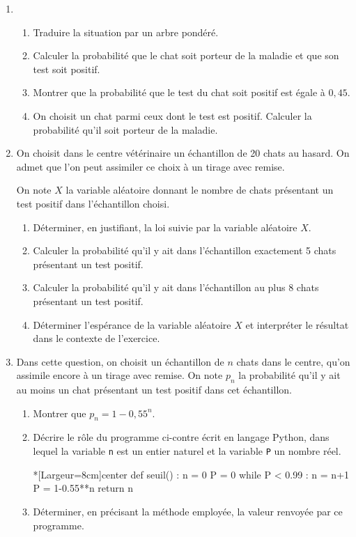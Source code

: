 \begin{enumerate}
	\item 
	\begin{enumerate}
		\item Traduire la situation par un arbre pondéré.
		\item Calculer la probabilité que le chat soit porteur de la maladie et que son test soit positif.
		\item Montrer que la probabilité que le test du chat soit positif est égale à $0,45$.
		\item On choisit un chat parmi ceux dont le test est positif. Calculer la probabilité qu’il soit porteur de la maladie.
	\end{enumerate}
	\item On choisit dans le centre vétérinaire un échantillon de 20 chats au hasard. On admet que l’on peut assimiler ce choix à un tirage avec remise.
	
	On note $X$ la variable aléatoire donnant le nombre de chats présentant un test positif dans
	l’échantillon choisi.
	\begin{enumerate}
		\item Déterminer, en justifiant, la loi suivie par la variable aléatoire $X$.
		\item Calculer la probabilité qu’il y ait dans l’échantillon exactement 5 chats présentant un test positif.
		\item Calculer la probabilité qu’il y ait dans l’échantillon au plus 8 chats présentant un test positif.
		\item Déterminer l’espérance de la variable aléatoire $X$ et interpréter le résultat dans le contexte de l’exercice.
	\end{enumerate}
	\item Dans cette question, on choisit un échantillon de $n$ chats dans le centre, qu’on assimile encore à un tirage avec remise. On note $p_n$ la probabilité qu’il y ait au moins un chat présentant un test positif dans cet échantillon.
	\begin{enumerate}
		\item Montrer que $p_n = 1 - 0,55^n$.
		\item Décrire le rôle du programme ci-contre écrit en langage \textsf{Python}, dans lequel la variable \texttt{n} est un entier naturel et la variable \texttt{P} un nombre réel.
\begin{CodePythonLstAlt}*[Largeur=8cm]{center}
def seuil() :
	n = 0
	P = 0
	while P < 0.99 :
		n = n+1
		P = 1-0.55**n
	return n
\end{CodePythonLstAlt}
		\item Déterminer, en précisant la méthode employée, la valeur renvoyée par ce programme.
	\end{enumerate}
\end{enumerate}

